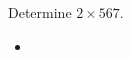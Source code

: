 \documentclass[paper=6.125in:9.25in,twoside,openright,pagesize=pdftex,10pt]{scrbook}
\begin{document}
Determine
$
2 \times 
567
.
$

\begin{itemize}
\item 
\end{itemize}
\end{document}

